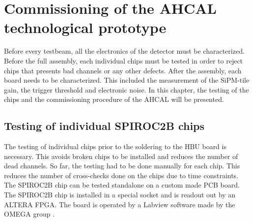 \chapter{Commissioning of the AHCAL technological prototype}

Before every testbeam, all the electronics of the detector must be characterized. Before the full assembly, each individual chips must be tested in order to reject chips that presents bad channels or any other defects. After the assembly, each board needs to be characterized. This included the measurement of the SiPM-tile gain, the trigger threshold and electronic noise. In this chapter, the testing of the chips and the commissioning procedure of the AHCAL will be presented.

\section{Testing of individual SPIROC2B chips}

The testing of individual chips prior to the soldering to the HBU board is necessary. This avoids broken chips to be installed and reduces the number of dead channels. So far, the testing had to be done manually for each chip. This reduces the number of cross-checks done on the chips due to time constraints. The SPIROC2B chip can be tested standalone on a custom made PCB board. The SPIROC2B chip is installed in a special socket and is readout out by an ALTERA FPGA. The board is operated by a Labview software made by the OMEGA group \cite{OmegaWeb}.

